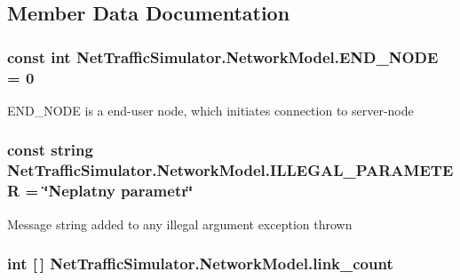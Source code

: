 \subsection{Member Data Documentation}
\hypertarget{classNetTrafficSimulator_1_1NetworkModel_a1335e5ee160345ac2f849998d94f2934}{
\subsubsection[{E\-N\-D\-\_\-\-N\-O\-D\-E}]{\setlength{\rightskip}{0pt plus 5cm}const int Net\-Traffic\-Simulator.\-Network\-Model.\-E\-N\-D\-\_\-\-N\-O\-D\-E = 0}}\label{classNetTrafficSimulator_1_1NetworkModel_a1335e5ee160345ac2f849998d94f2934}
E\-N\-D\-\_\-\-N\-O\-D\-E is a end-\/user node, which initiates connection to server-\/node \hypertarget{classNetTrafficSimulator_1_1NetworkModel_a9ff3800009133089edb0744d2771b0b9}{
\subsubsection[{I\-L\-L\-E\-G\-A\-L\-\_\-\-P\-A\-R\-A\-M\-E\-T\-E\-R}]{\setlength{\rightskip}{0pt plus 5cm}const string Net\-Traffic\-Simulator.\-Network\-Model.\-I\-L\-L\-E\-G\-A\-L\-\_\-\-P\-A\-R\-A\-M\-E\-T\-E\-R = \char`\"{}Neplatny parametr\char`\"{}\hspace{0.3cm}{\ttfamily [private]}}}\label{classNetTrafficSimulator_1_1NetworkModel_a9ff3800009133089edb0744d2771b0b9}
Message string added to any illegal argument exception thrown \hypertarget{classNetTrafficSimulator_1_1NetworkModel_a1437bfc2aad1a396054b03452e60c0dd}{
\subsubsection[{link\-\_\-count}]{\setlength{\rightskip}{0pt plus 5cm}int \mbox{[}$\,$\mbox{]} Net\-Traffic\-Simulator.\-Network\-Model.\-link\-\_\-count\hspace{0.3cm}{\ttfamily [private]}}}\label{classNetTrafficSimulator_1_1NetworkModel_a1437bfc2aad1a396054b03452e60c0dd}
